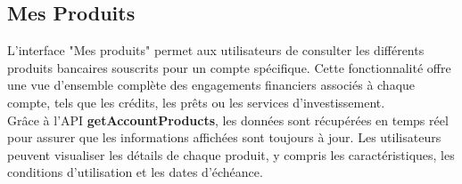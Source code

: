 \subsection{Mes Produits}
L'interface "Mes produits" permet aux utilisateurs de consulter les différents produits bancaires souscrits pour un compte spécifique. Cette fonctionnalité offre une vue d'ensemble complète des engagements financiers associés à chaque compte, tels que les crédits, les prêts ou les services d'investissement.\\

Grâce à l'API \textbf{getAccountProducts}, les données sont récupérées en temps réel pour assurer que les informations affichées sont toujours à jour. Les utilisateurs peuvent visualiser les détails de chaque produit, y compris les caractéristiques, les conditions d'utilisation et les dates d'échéance.

